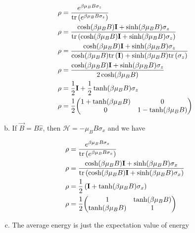 \documentclass[]{article}
\begin{document}
\begin{enumerate}[1)]
\begin{enumerate}[a)]
\begin{equation}
\begin{split}
\rho & = \frac{   e^{\beta\mu_BB\sigma_z}   }{\text{tr}\left(  e^{\beta\mu_BB\sigma_z}   \right)} \\
\rho & = \frac{   \cosh(\beta\mu_BB)\textbf{I} + \sinh(\beta\mu_BB)\sigma_z }{\text{tr}\left(   \cosh(\beta\mu_BB)\textbf{I} + \sinh(\beta\mu_BB)\sigma_z\right)} \\
\rho & = \frac{   \cosh(\beta\mu_BB)\textbf{I} + \sinh(\beta\mu_BB)\sigma_z }{\cosh(\beta\mu_BB)\text{tr}\left(   \textbf{I} \right)  + \sinh(\beta\mu_BB)\text{tr}\left(\sigma_z\right)} \\
\rho & = \frac{   \cosh(\beta\mu_BB)\textbf{I} + \sinh(\beta\mu_BB)\sigma_z }{2\cosh(\beta\mu_BB)}  \\
\rho & = \frac{1}{2}\textbf{I} + \frac{1}{2}\tanh(\beta\mu_BB)\sigma_z      \\
\rho & = \frac{1}{2}\mqty( 1 +   \tanh(\beta\mu_BB) & 0 \\ 0 & 1 -  \tanh(\beta\mu_BB)     ) \\
\end{split}
\end{equation}
\item If $\vec{B}=B\hat{x}$, then $\mathcal{H}=-\mu_BB\sigma_x$ and we have

\begin{equation}
\begin{split}
\rho & = \frac{   e^{\beta\mu_BB\sigma_x}   }{\text{tr}\left(  e^{\beta\mu_BB\sigma_x}   \right)} \\
\rho & = \frac{   \cosh(\beta\mu_BB)\textbf{I} + \sinh(\beta\mu_BB)\sigma_x }{\text{tr}\left(   \cosh(\beta\mu_BB)\textbf{I} + \sinh(\beta\mu_BB)\sigma_x\right)} \\
\rho & = \frac{1}{2} \left(    \textbf{I} +  \tanh(\beta\mu_BB)\sigma_x   \right) \\ 
\rho & = \frac{1}{2} \mqty( 1 &  \tanh(\beta\mu_BB) \\ \tanh(\beta\mu_BB) & 1    )     \\
\end{split}
\end{equation}

\item The average energy is just the expectation value of energy


\end{enumerate}
\end{enumerate}
\end{document}
